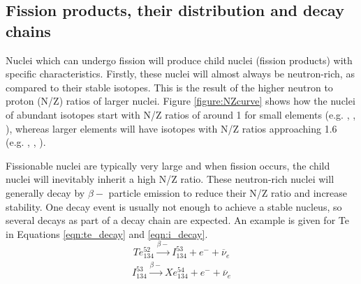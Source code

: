 \subsection{Fission products, their distribution and decay chains}

Nuclei which can undergo fission will produce child nuclei (fission products) with specific characteristics. Firstly, these nuclei will almost always be neutron-rich, as compared to their stable isotopes. This is the result of the higher neutron to proton (N/Z) ratios of larger nuclei. Figure \ref{figure:NZcurve} shows how the nuclei of abundant isotopes start with N/Z ratios of around 1 for small elements (e.g. , , ), whereas larger elements will have isotopes with N/Z ratios approaching 1.6 (e.g. , , ). 

Fissionable nuclei are typically very large and when fission occurs, the child nuclei will inevitably inherit a high N/Z ratio. These neutron-rich nuclei will generally decay by $\beta-$ particle emission to reduce their N/Z ratio and increase stability. One decay event is usually not enough to achieve a stable nucleus, so several decays as part of a decay chain are expected. An example is given for Te in Equations \ref{eqn:te_decay} and \ref{eqn:i_decay}.
\begin{equation}
Te_{134}^{52} \xrightarrow[]{\beta-} I_{134}^{53}+ e^{-} + \overline{\nu}_{e}
\label{eqn:te_decay}
\end{equation}
\begin{equation}
I_{134}^{53} \xrightarrow[]{\beta-} Xe_{134}^{54} + e^{-} + \overline{\nu}_{e}
\label{eqn:i_decay}
\end{equation}

